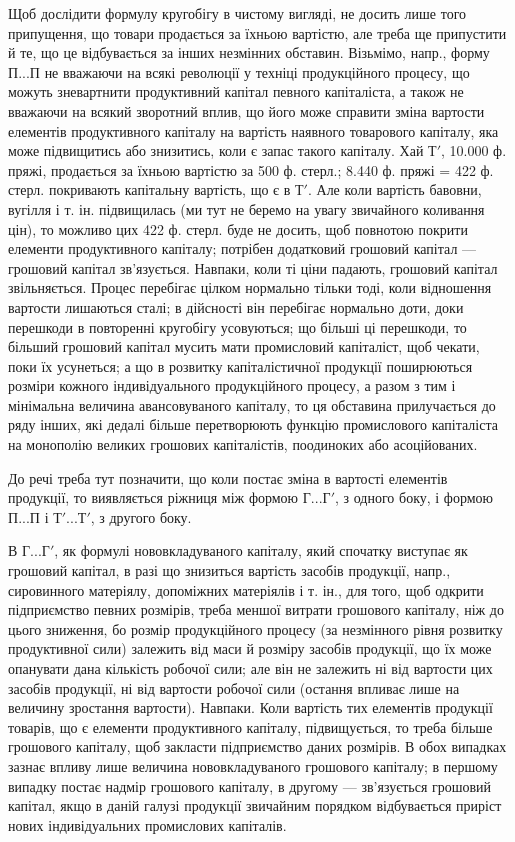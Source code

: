 Щоб дослідити формулу кругобігу в чистому вигляді, не досить лише
того припущення, що товари продається за їхньою вартістю, але треба
ще припустити й те, що це відбувається за інших незмінних обставин.
Візьмімо, напр., форму $П... П$ не вважаючи на всякі революції у техніці
продукційного процесу, що можуть зневартнити продуктивний капітал певного
капіталіста, а також не вважаючи на всякий зворотний вплив, що
його може справити зміна вартости елементів продуктивного капіталу на
вартість наявного товарового капіталу, яка може підвищитись або
знизитись, коли є запас такого капіталу. Хай $Т'$, 10.000 ф. пряжі,
продається за їхньою вартістю за 500 ф. стерл.; 8.440 ф. пряжі =
422 ф. стерл. покривають капітальну вартість, що є в $Т'$. Але коли
вартість бавовни, вугілля і т. ін. підвищилась (ми тут не беремо на увагу
звичайного коливання цін), то можливо цих 422 ф. стерл. буде не досить,
щоб повнотою покрити елементи продуктивного капіталу; потрібен додатковий
грошовий капітал — грошовий капітал зв’язується. Навпаки, коли
ті ціни падають, грошовий капітал звільняється. Процес перебігає цілком
нормально тільки тоді, коли відношення вартости лишаються сталі; в дійсності
він перебігає нормально доти, доки перешкоди в повторенні кругобігу
усовуються; що більші ці перешкоди, то більший грошовий капітал
мусить мати промисловий капіталіст, щоб чекати, поки їх усунеться; а що в
розвитку капіталістичної продукції поширюються розміри кожного індивідуального
продукційного процесу, а разом з тим і мінімальна величина
авансовуваного капіталу, то ця обставина прилучається до ряду
інших, які дедалі більше перетворюють функцію промислового капіталіста
на монополію великих грошових капіталістів, поодиноких або
асоційованих.

До речі треба тут позначити, що коли постає зміна в вартості елементів
продукції, то виявляється ріжниця між формою $Г... Г'$, з одного
боку, і формою $П.. . П$ і $Т'.. . Т'$, з другого боку.

В $Г... Г'$, як формулі нововкладуваного капіталу, який спочатку
виступає як грошовий капітал, в разі що знизиться вартість засобів
продукції, напр., сировинного матеріялу, допоміжних матеріялів і т. ін., для
того, щоб одкрити підприємство певних розмірів, треба меншої витрати
грошового капіталу, ніж до цього зниження, бо розмір продукційного
процесу (за незмінного рівня розвитку продуктивної сили) залежить від
маси й розміру засобів продукції, що їх може опанувати дана кількість
робочої сили; але він не залежить ні від вартости цих засобів продукції,
ні від вартости робочої сили (остання впливає лише на величину
зростання вартости). Навпаки. Коли вартість тих елементів продукції товарів,
що є елементи продуктивного капіталу, підвищується, то треба
більше грошового капіталу, щоб закласти підприємство даних розмірів.
В обох випадках зазнає впливу лише величина нововкладуваного грошового
капіталу; в першому випадку постає надмір грошового капіталу, в
другому — зв’язується грошовий капітал, якщо в даній галузі продукції
звичайним порядком відбувається приріст нових індивідуальних промислових
капіталів.


